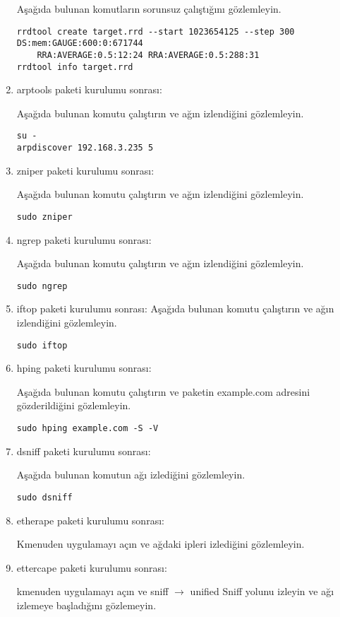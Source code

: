\documentclass[a4paper,10pt]{article}
\begin{document}
\begin{enumerate}
Aşağıda bulunan komutların sorunsuz çalıştığını gözlemleyin.
\begin{verbatim}
rrdtool create target.rrd --start 1023654125 --step 300 DS:mem:GAUGE:600:0:671744  
	RRA:AVERAGE:0.5:12:24 RRA:AVERAGE:0.5:288:31 
rrdtool info target.rrd
\end{verbatim}


\item arptools paketi kurulumu sonrası:

Aşağıda bulunan komutu çalıştırın ve ağın izlendiğini gözlemleyin.
\begin{verbatim}
su -
arpdiscover 192.168.3.235 5
\end{verbatim}

\item zniper paketi kurulumu sonrası:

Aşağıda bulunan komutu çalıştırın ve ağın izlendiğini gözlemleyin.
\begin{verbatim}
sudo zniper
\end{verbatim}

\item ngrep paketi kurulumu sonrası:

Aşağıda bulunan komutu çalıştırın ve ağın izlendiğini gözlemleyin.
\begin{verbatim}
sudo ngrep
\end{verbatim}


\item iftop paketi kurulumu sonrası:
Aşağıda bulunan komutu çalıştırın ve ağın izlendiğini gözlemleyin.
\begin{verbatim}
sudo iftop 
\end{verbatim}

 \item hping paketi kurulumu sonrası:

Aşağıda bulunan komutu çalıştırın ve paketin example.com adresini gözderildiğini gözlemleyin.
\begin{verbatim}
sudo hping example.com -S -V 
\end{verbatim}


 \item dsniff paketi kurulumu sonrası:

Aşağıda bulunan komutun ağı izlediğini gözlemleyin.
\begin{verbatim}
sudo dsniff
\end{verbatim}

\item etherape paketi kurulumu sonrası:

Kmenuden uygulamayı açın ve ağdaki ipleri izlediğini gözlemleyin.

\item ettercape paketi kurulumu sonrası:

kmenuden uygulamayı açın ve sniff $\rightarrow$ unified Sniff yolunu izleyin ve ağı izlemeye başladığını gözlemeyin.
\end{enumerate}
\end{document}
